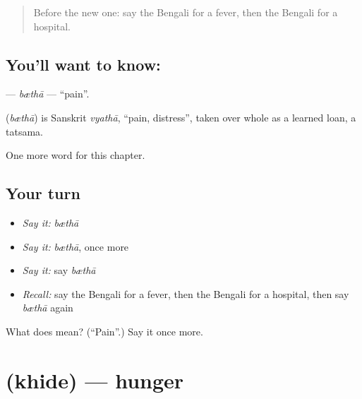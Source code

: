 \label{lesson:BN-C44-btha}



\begin{quote}
Before the new one: say the Bengali for a fever, then the Bengali for a hospital.
\end{quote}

\subsection*{You'll want to know: }
\textbf{} — \emph{bæthā} — \textquotedblleft{}pain\textquotedblright{}.

\begin{cousinweb}
\textbf{} (\emph{bæthā}) is Sanskrit \emph{vyathā}, \textquotedblleft{}pain, distress\textquotedblright{}, taken over whole as a learned loan, a tatsama.
\end{cousinweb}

\begin{grammarlens}[title={What you've built}]
One more word for this chapter.
\end{grammarlens}

\subsection*{Your turn}
\begin{itemize}
\raggedright
  \item \emph{Say it:} \emph{bæthā}
  \item \emph{Say it:} \emph{bæthā}, once more
  \item \emph{Say it:} say \emph{bæthā}
  \item \emph{Recall:} say the Bengali for a fever, then the Bengali for a hospital, then say \emph{bæthā} again
\end{itemize}

\begin{tcolorbox}[breakable,colback=teal!4,colframe=teal!35!black,title={Before you move on}]
What does  mean? (\textquotedblleft{}Pain\textquotedblright{}.) Say it once more.
\end{tcolorbox}
\section[\texorpdfstring{\bn{খিদে} (khide)}{খিদে (khide)}]{ (khide) — hunger}

\label{lesson:BN-C44-khide}




